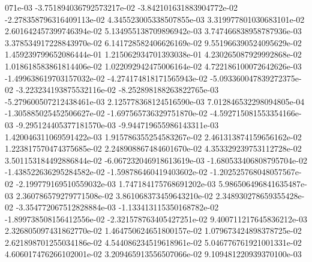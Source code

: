 071e-03	-3.751894036792573217e-02	-3.842101631883904772e-02	-2.278358796316409113e-02	4.345523005338507855e-03	3.319977801030683101e-02	2.601642457399746394e-02	5.134955138709896942e-03	3.747466838958787936e-03	3.378534917228843970e-02	6.141728582406626169e-02	9.551966390524095629e-02	1.459239799652086444e-01	1.215062934701393038e-01	4.230265087929992868e-02	1.018618583861814406e-02	1.022092942475006164e-02	4.722186100072642626e-03	-1.499638619703157032e-02	-4.274174818171565943e-02	-5.093360047839272375e-02	-3.223234193875532116e-02	-8.252898188263822765e-03	-5.279600507212438461e-03	2.125778368124516590e-03	7.012846532298094805e-04	-1.305885025452506627e-02	-1.697565736329751870e-02	-4.592715081553354166e-03	-9.295124405377181570e-03	-9.944719655986143311e-03	1.420046311069591422e-03	1.915786355254583267e-02	2.461313874159656162e-02	1.223817570474375685e-02	2.248908867484601670e-02	4.353329239753112728e-02	3.501153184492886844e-02	-6.067232046918613619e-03	-1.680533406808795704e-02	-1.438522636295284582e-02	-1.598786460419403602e-02	-1.202525768048057567e-02	-2.199779169510559032e-03	1.747184175768691202e-03	5.986506496841635487e-03	2.360786579279771508e-02	3.861068373459643210e-02	2.348930278659355428e-02	-3.354772067512828884e-03	-1.133413115350168782e-02	-1.899738508156412556e-02	-2.321578763405427251e-02	9.400711217645836212e-03	2.326805097431862770e-02	1.464750624651800157e-02	1.079673424898378725e-02	2.621898701255034186e-02	4.544086234519618961e-02	5.046776761921001331e-02	4.606017476266102001e-02	3.209465913556507066e-02	9.109481220939370100e-03
